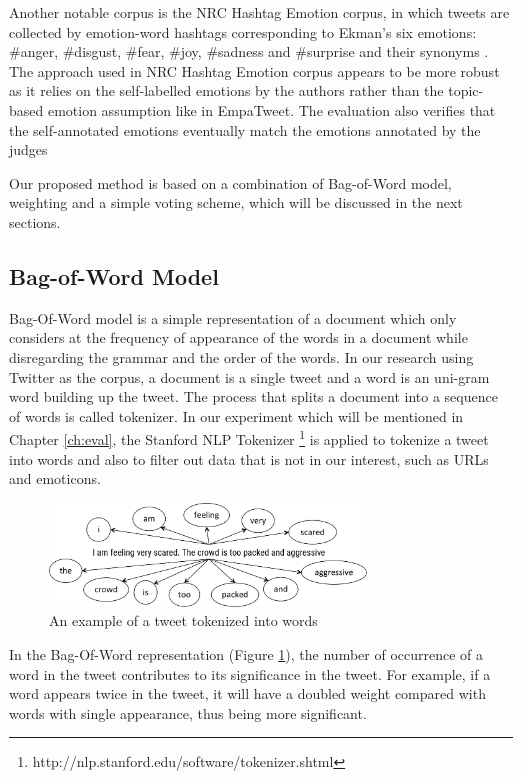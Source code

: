 Another notable corpus is the NRC Hashtag Emotion corpus, in which tweets are collected by emotion-word hashtags corresponding to Ekman's six emotions: \#anger, \#disgust, \#fear, \#joy, \#sadness and \#surprise and their synonyms \citep{mohammad2012emotional}. The approach used in NRC Hashtag Emotion corpus appears to be more robust as it relies on the self-labelled emotions by the authors rather than the topic-based emotion assumption like in EmpaTweet. The evaluation also verifies that the self-annotated emotions eventually match the emotions annotated by the judges

Our proposed method is based on a combination of Bag-of-Word model, weighting and a simple voting scheme, which will be discussed in the next sections.

\subsection{Bag-of-Word Model}
Bag-Of-Word model is a simple representation of a document which only considers at the frequency of appearance of the words in a document while disregarding the grammar and the order of the words. In our research using Twitter as the corpus, a document is a single tweet and a word is an uni-gram word building up the tweet. The process that splits a document into a sequence of words is called tokenizer. In our experiment which will be mentioned in Chapter \ref{ch:eval}, the Stanford NLP Tokenizer \footnote{http://nlp.stanford.edu/software/tokenizer.shtml} is applied to tokenize a tweet into words and also to filter out data that is not in our interest, such as URLs and emoticons. 

\begin{figure}[htb!] 
\centering    
\includegraphics[width=0.75\textwidth]{BagOfWord}
\caption{An example of a tweet tokenized into words}
\label{fig:bagOfWord}
\end{figure}

In the Bag-Of-Word representation (Figure \ref{fig:bagOfWord}), the number of occurrence of a word in the tweet contributes to its significance in the tweet. For example, if a word appears twice in the tweet, it will have a doubled weight compared with words with single appearance, thus being more significant. 

